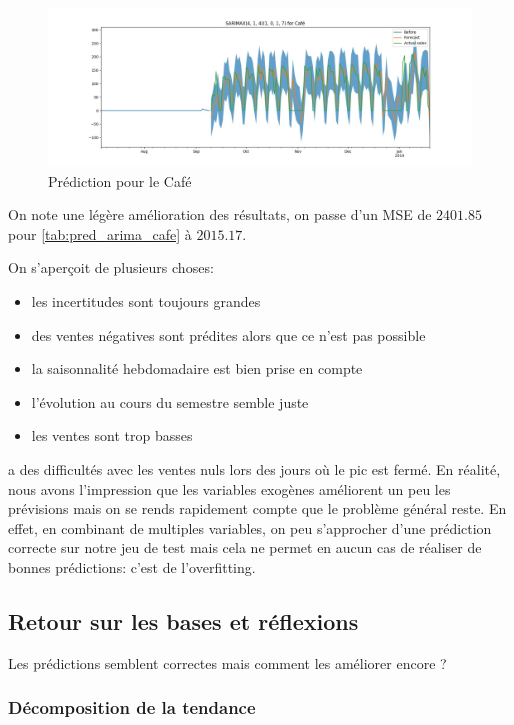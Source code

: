 \begin{figure}[ht]
    \centering
    \includegraphics[width=\textwidth]{figures/pred_sarimax_cafe.jpg}
    \caption{Prédiction \SARIMAX pour le Café}
    \label{fig:pred_sarimax_cafe}
\end{figure}

On note une légère amélioration des résultats, on passe d'un MSE de $2401.85$ pour \ARIMA \ref{tab:pred_arima_cafe} à $2015.17$.

On s'aperçoit de plusieurs choses:
\begin{itemize}[nolistsep]
    \item les incertitudes sont toujours grandes
    \item des ventes négatives sont prédites alors que ce n'est pas possible
    \item la saisonnalité hebdomadaire est bien prise en compte
    \item l'évolution au cours du semestre semble juste
    \item les ventes sont trop basses
\end{itemize}

\SARIMAX a des difficultés avec les ventes nuls lors des jours où le pic est fermé. En réalité, nous avons l'impression que les variables exogènes améliorent un peu les prévisions mais on se rends rapidement compte que le problème général reste. En effet, en combinant de multiples variables, on peu s'approcher d'une prédiction correcte sur notre jeu de test mais cela ne permet en aucun cas de réaliser de bonnes prédictions: c'est de l'overfitting.


\subsection{Retour sur les bases et réflexions}
\label{subsec:back_to_basics}

Les prédictions semblent correctes mais comment les améliorer encore ?

\subsubsection{Décomposition de la tendance}
\label{subsec:decomp_trend}

